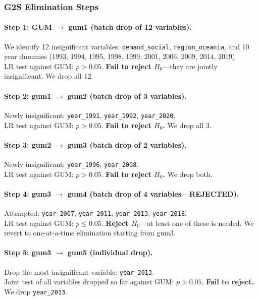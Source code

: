 \documentclass[12pt,a4paper]{article}
\begin{document}
\subsubsection{G2S Elimination Steps}

\paragraph{Step 1: GUM $\to$ gum1 (batch drop of 12 variables).}
We identify 12 insignificant variables: \texttt{demand\_social}, \texttt{region\_oceania}, and 10 year dummies (1993, 1994, 1995, 1998, 1999, 2001, 2006, 2009, 2014, 2019).\\
LR test against GUM: $p > 0.05$. \textbf{Fail to reject $H_0$}---they are jointly insignificant. We drop all 12.

\paragraph{Step 2: gum1 $\to$ gum2 (batch drop of 3 variables).}
Newly insignificant: \texttt{year\_1991}, \texttt{year\_1992}, \texttt{year\_2020}.\\
LR test against GUM: $p > 0.05$. \textbf{Fail to reject $H_0$.} We drop all 3.

\paragraph{Step 3: gum2 $\to$ gum3 (batch drop of 2 variables).}
Newly insignificant: \texttt{year\_1996}, \texttt{year\_2008}.\\
LR test against GUM: $p > 0.05$. \textbf{Fail to reject $H_0$.} We drop both.

\paragraph{Step 4: gum3 $\to$ gum4 (batch drop of 4 variables---REJECTED).}
Attempted: \texttt{year\_2007}, \texttt{year\_2011}, \texttt{year\_2013}, \texttt{year\_2018}.\\
LR test against GUM: $p \leq 0.05$. \textbf{Reject $H_0$}---at least one of these is needed. We revert to one-at-a-time elimination starting from gum3.

\paragraph{Step 5: gum3 $\to$ gum5 (individual drop).}
Drop the most insignificant variable: \texttt{year\_2013}.\\
Joint test of all variables dropped so far against GUM: $p > 0.05$. \textbf{Fail to reject.} We drop \texttt{year\_2013}.
\end{document}
